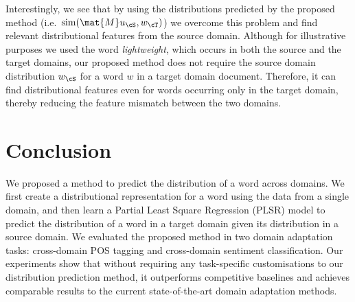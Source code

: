 \documentclass[11pt]{article}
\begin{document}
Interestingly, we see that by using the distributions predicted by the proposed method (i.e.\ ${\rm sim}(\mat{M}u_{\cS}, w_{\cT})$)
we overcome this problem and find relevant distributional features from the source domain.
Although for illustrative purposes we used the word \textit{lightweight}, which occurs in both the source and the target domains, our proposed method does not require the source domain distribution $w_{\cS}$ for a word $w$ in a target domain document.
Therefore, it can find distributional features even for words occurring only in the target domain, 
thereby reducing the feature mismatch between the two domains.


\section{Conclusion}
We proposed a method to predict the distribution of a word across domains.
We first create a distributional representation for a word using the data from a single domain,
and then learn a Partial Least Square Regression (PLSR) model to predict the distribution of a word
in a target domain given its distribution in a source domain.
We evaluated the proposed method in two domain adaptation tasks: cross-domain POS tagging and 
cross-domain sentiment classification.
Our experiments show that without requiring any task-specific customisations to our distribution
prediction method, it outperforms competitive baselines and achieves comparable results to
the current state-of-the-art domain adaptation methods.




\end{document}
